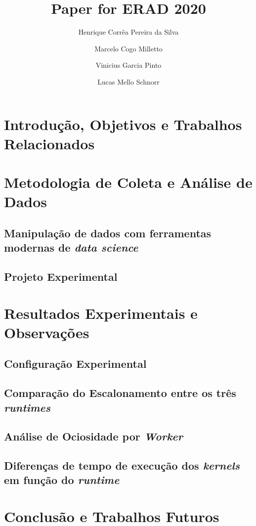\documentclass[12pt]{article}
\date{}
\title{Paper for ERAD 2020}
\begin{document}
\author{
   Henrique Corrêa Pereira da Silva\and%
   Marcelo Cogo Milletto\and
   Vinicius Garcia Pinto\and
   Lucas Mello Schnorr
}

\address{
  Instituto de Informática -- Universidade Federal do Rio Grande do Sul (UFRGS)\\
  Caixa Postal 15.064 -- 91.501-970 -- Porto Alegre -- RS -- Brasil
}

\maketitle

\begin{resumo}

\end{resumo}

\section{Introdução, Objetivos e Trabalhos Relacionados}
\label{sec:org5909530}

\section{Metodologia de Coleta e Análise de Dados}
\label{sec:org48b5dae}

\subsection{Manipulação de dados com ferramentas modernas de \emph{data science}}
\label{sec:orgc7ce29c}

\subsection{Projeto Experimental}
\label{sec:org1cafe92}

\section{Resultados Experimentais e Observações}
\label{sec:orga1829da}

\subsection{Configuração Experimental}
\label{sec:org130c3a6}

\subsection{Comparação do Escalonamento entre os três \emph{runtimes}}
\label{sec:org4f30eed}

\subsection{Análise de Ociosidade por \emph{Worker}}
\label{sec:orgc74de53}

\subsection{Diferenças de tempo de execução dos \emph{kernels} em função do \emph{runtime}}
\label{sec:orgb8632bb}

\section{Conclusão e Trabalhos Futuros}
\label{sec:org4cd723b}
\end{document}
